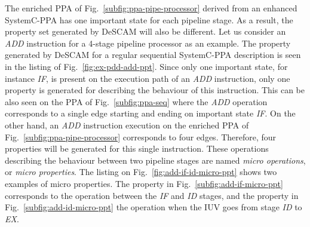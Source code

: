 The enriched PPA of Fig.~\ref{subfig:ppa-pipe-processor} derived from an enhanced SystemC-PPA has one important state for each pipeline stage. As a result, the property set generated by DeSCAM will also be different. Let us consider an \textit{ADD} instruction for a 4-stage pipeline processor as an example. The property generated by DeSCAM for a regular sequential SystemC-PPA description is seen in the listing of Fig.~\ref{fig:ex-pdd-add-ppt}. Since only one important state, for instance \textit{IF}, is present on the execution path of an \textit{ADD} instruction, only one property is generated for describing the behaviour of this instruction. This can be also seen on the PPA of Fig.~\ref{subfig:ppa-seq} where the \textit{ADD} operation corresponds to a single edge starting  and ending on important state \textit{IF}. On the other hand, an \textit{ADD} instruction execution on the enriched PPA of Fig.~\ref{subfig:ppa-pipe-processor} corresponds to four edges. Therefore, four properties will be generated for this single instruction. These operations describing the behaviour between two pipeline stages are named \textit{micro operations}, or \textit{micro properties}. The listing on Fig.~\ref{fig:add-if-id-micro-ppt} shows two examples of micro properties. The property in Fig.~\ref{subfig:add-if-micro-ppt} corresponds to the operation between the \textit{IF} and \textit{ID} stages, and the property in Fig.~\ref{subfig:add-id-micro-ppt} the operation when the IUV goes from stage \textit{ID} to \textit{EX}.

